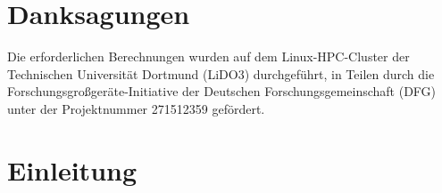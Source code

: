 \chapter{Danksagungen}
Die erforderlichen Berechnungen wurden auf dem Linux-HPC-Cluster der Technischen Universität Dortmund (LiDO3) durchgeführt, in Teilen durch die Forschungsgroßgeräte-Initiative der Deutschen Forschungsgemeinschaft (DFG) unter der Projektnummer 271512359 gefördert.

\chapter{Einleitung}





